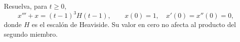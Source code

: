 Resuelva, para \(t\ge0\),
\[x'''+x=(t-1)^3H(t-1),\qquad x(0)=1,\quad x'(0)=x''(0)=0,\]
donde \(H\) es el escalón de Heaviside. Su valor en cero no afecta al producto del segundo miembro.
